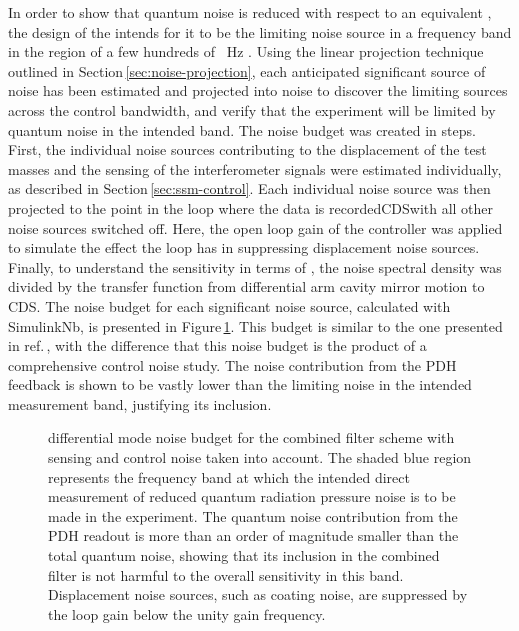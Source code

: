 In order to show that quantum noise is reduced with respect to an equivalent \FPMI{}, the design of the \SSMEXPT{} intends for it to be the limiting noise source in a frequency band in the region of a few hundreds of \SI{}{\hertz} \cite{Graef2014}. Using the linear projection technique outlined in Section\,\ref{sec:noise-projection}, each anticipated significant source of noise has been estimated and projected into \LMINUS{} noise to discover the limiting sources across the control bandwidth, and verify that the experiment will be limited by quantum noise in the intended band. The noise budget was created in steps. First, the individual noise sources contributing to the displacement of the test masses and the sensing of the interferometer signals were estimated individually, as described in Section\,\ref{sec:ssm-control}. Each individual noise source was then projected to the point in the loop where the data is recorded\textemdash \gls{CDS}\textemdash with all other noise sources switched off. Here, the open loop gain of the controller was applied to simulate the effect the loop has in suppressing displacement noise sources. Finally, to understand the sensitivity in terms of \LMINUS{}, the noise spectral density was divided by the transfer function from differential arm cavity mirror motion to \gls{CDS}. The noise budget for each significant noise source, calculated with SimulinkNb, is presented in Figure\,\ref{fig:noise-budget}. This budget is similar to the one presented in ref.\,\cite{Graef2014}, with the difference that this noise budget is the product of a comprehensive control noise study. The noise contribution from the \gls{PDH} feedback is shown to be vastly lower than the limiting noise in the intended measurement band, justifying its inclusion.

\begin{figure}
  
  \caption[Control noise budget for the \SSMEXPT{}]{\label{fig:noise-budget}\SSM{} differential mode noise budget for the combined filter scheme with sensing and control noise taken into account. The shaded blue region represents the frequency band at which the intended direct measurement of reduced quantum radiation pressure noise is to be made in the experiment. The quantum noise contribution from the \gls{PDH} readout is more than an order of magnitude smaller than the total quantum noise, showing that its inclusion in the combined filter is not harmful to the overall sensitivity in this band. Displacement noise sources, such as coating noise, are suppressed by the loop gain below the unity gain frequency.}
\end{figure}

